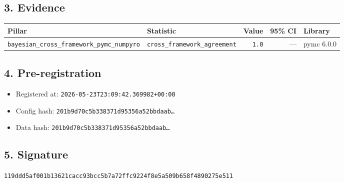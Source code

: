 \documentclass{article}
\begin{document}
\subsection*{3. Evidence}
\begin{tabular}{llrrl}\toprule
\textbf{Pillar} & \textbf{Statistic} & \textbf{Value} & \textbf{95\% CI} & \textbf{Library} \\\midrule
\texttt{bayesian\_cross\_framework\_pymc\_numpyro} & \texttt{cross\_framework\_agreement} & \texttt{1.0} & --- & pymc 6.0.0 \\
\bottomrule\end{tabular}
\subsection*{4. Pre-registration}
\begin{itemize}
\item Registered at: \texttt{2026-05-23T23:09:42.369982+00:00}
\item Config hash: \texttt{201b9d70c5b338371d95356a52bbdaab\dots}
\item Data hash: \texttt{201b9d70c5b338371d95356a52bbdaab\dots}
\end{itemize}
\subsection*{5. Signature}
\texttt{119ddd5af001b13621cacc93bcc5b7a72ffc9224f8e5a509b658f4890275e511}\\
\end{document}
